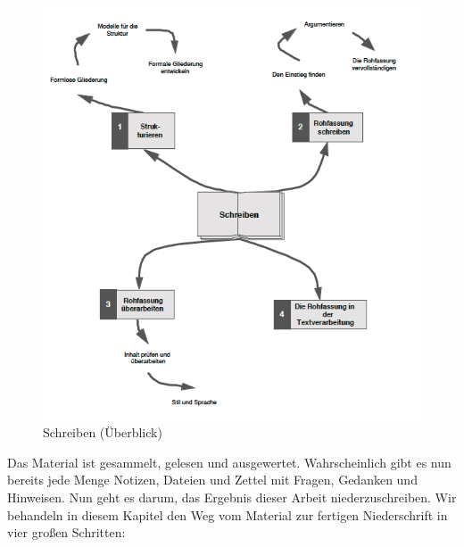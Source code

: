 \documentclass[]{book}
\theoremstyle{definition}
\theoremstyle{definition}
\theoremstyle{definition}
\theoremstyle{remark}
\begin{document}
\begin{figure}

{\centering \includegraphics{images/schreiben-min} 

}

\caption{Schreiben (Überblick)}\label{fig:unnamed-chunk-20}
\end{figure}

Das Material ist gesammelt, gelesen und ausgewertet. Wahrscheinlich gibt
es nun bereits jede Menge Notizen, Dateien und Zettel mit Fragen,
Gedanken und Hinweisen. Nun geht es darum, das Ergebnis dieser Arbeit
niederzuschreiben. Wir behandeln in diesem Kapitel den Weg vom Material
zur fertigen Niederschrift in vier großen Schritten:
\end{document}
